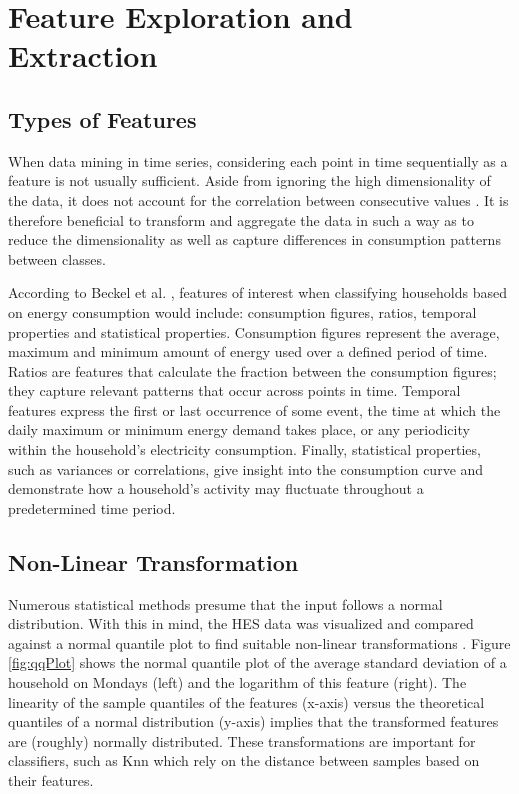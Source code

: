 \chapter{Feature Exploration and Extraction}
\label{ch:Features}

\section{Types of Features}
When data mining in time series, considering each point in time sequentially as a feature is not usually sufficient. Aside from ignoring the high dimensionality of the data, it does not account for the correlation between consecutive values \cite{Moerchen}. It is therefore beneficial to transform and aggregate the data in such a way as to reduce the dimensionality as well as capture differences in consumption patterns between classes. 

According to Beckel et al. \cite{Beckel_2}, features of interest when classifying households based on energy consumption would include: consumption figures, ratios, temporal properties and statistical properties. Consumption figures represent the average, maximum and minimum amount of energy used over a defined period of time. Ratios are features that calculate the fraction between the consumption figures; they capture relevant patterns that occur across points in time. Temporal features express the first or last occurrence of some event, the time at which the daily maximum or minimum energy demand takes place, or any periodicity within the household's electricity consumption. Finally, statistical properties, such as variances or correlations, give insight into the consumption curve and demonstrate how a household's activity may fluctuate throughout a predetermined time period.

\section{Non-Linear Transformation}
Numerous statistical methods presume that the input follows a normal distribution. With this in mind, the HES data was visualized and compared against a normal quantile plot to find suitable non-linear transformations \cite{Osborne} \cite{Wang}. Figure \ref{fig:qqPlot} shows the normal quantile plot of the average standard deviation of a household on Mondays (left) and the logarithm of this feature (right). The linearity of the sample quantiles of the features (x-axis) versus the theoretical quantiles of a normal distribution (y-axis) implies that the transformed features are (roughly) normally distributed. These transformations are important for classifiers, such as Knn which rely on the distance between samples based on their features.

